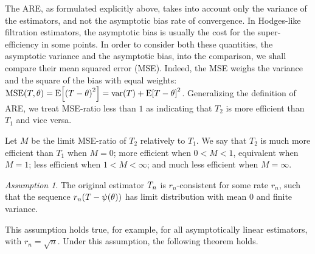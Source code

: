 \documentclass[ejs, twoside]{imsart}
\theoremstyle{plain}
\theoremstyle{remark}
\newtheorem{assumption}[theorem]{Assumption}
\newcommand{\fullstop}{\text{.}}
\newcommand{\real}{\mathbb{R}}
\newcommand{\MSE}{\operatorname{MSE}}
\numberwithin{equation}{section}
\numberwithin{table}{section}
\numberwithin{figure}{section}
\let\originalleft\left
\let\originalright\right
\renewcommand{\left}{\mathopen{}\mathclose\bgroup\originalleft}
\renewcommand{\right}{\aftergroup\egroup\originalright}
\begin{document}
	The ARE, as formulated explicitly above, takes into account only the variance of the estimators, and not the asymptotic bias rate of convergence. In Hodges-like filtration estimators, the asymptotic bias is usually the cost for the super-efficiency in some points. In order to consider both these quantities, the asymptotic variance and the asymptotic bias, into the comparison, we shall compare their mean squared error (MSE). Indeed, the MSE weighs the variance and the square of the bias with equal weights: \(\MSE\left(T,\theta \right) = \mean{\left(T-\theta \right)^2 } = \var{T} + \mean{T-\theta}^2 \). Generalizing the definition of ARE, we treat MSE-ratio less than \(1\) as indicating that \(T_2\) is more efficient than \(T_1\) and vice versa.
	
	
	Let \(M\) be the limit MSE-ratio of \(T_2\) relatively to \(T_1\). We say that \(T_2\) is much more efficient than \(T_1\) when \(M = 0\); more efficient when \(0<M<1 \), equivalent when \(M = 1\); less efficient when \(1<M<\infty \); and much less efficient when \(M = \infty\).
	
	
	\begin{assumption} \label{assum:asymunbiased}
		The original estimator \(\estimreg\) is \(r_n\)-consistent for some rate \(r_n\), such that the sequence \(r_n\left(T-\psi\left(\theta \right)  \right) \) has limit distribution with mean \(0\) and finite variance.
		
	\end{assumption}
	This assumption holds true, for example, for all asymptotically linear estimators, with \(r_n = \sqrt{n}\). Under this assumption, the following theorem holds.
	
	
\end{document}
